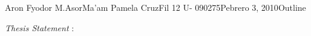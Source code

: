 \documentclass[12pt,letterpaper]{article}
\begin{document}
\begin{mla}{Aron Fyodor M.}{Asor}{Ma'am Pamela Cruz}{Fil 12 U- 090275}{Pebrero 3, 2010}{Outline}

	\noindent \textit{Thesis Statement} :  

\end{mla}
\end{document}
